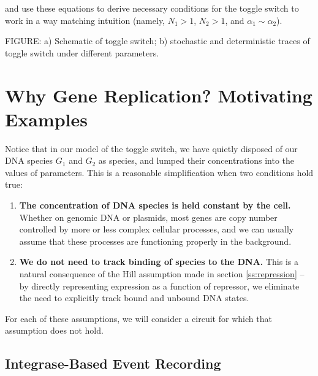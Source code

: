 \documentclass[preprint,12pt]{elsarticle}
\begin{document}
and use these equations to derive necessary conditions for the toggle switch to work in a way matching intuition (namely, $N_1 > 1$, $N_2 > 1$, and $\alpha_1 \sim \alpha_2$). 

\vspace{.5in}
FIGURE: a) Schematic of toggle switch; b) stochastic and deterministic traces of toggle switch under different parameters.
\vspace{.5in}

\section{Why Gene Replication? Motivating Examples}\label{S:motivation}

Notice that in our model of the toggle switch, we have quietly disposed of our DNA species $G_1$ and $G_2$ as species, and lumped their concentrations into the values of parameters. This is a reasonable simplification when two conditions hold true:

\begin{enumerate}
	\item \textbf{The concentration of DNA species is held constant by the cell.} Whether on genomic DNA or plasmids, most genes are copy number controlled by more or less complex cellular processes, and we can usually assume that these processes are functioning properly in the background.
	\item \textbf{We do not need to track binding of species to the DNA.} This is a natural consequence of the Hill assumption made in section \ref{ss:repression} -- by directly representing expression as a function of repressor, we eliminate the need to explicitly track bound and unbound DNA states. 
\end{enumerate}

For each of these assumptions, we will consider a circuit for which that assumption does not hold. 

\subsection{Integrase-Based Event Recording}
\end{document}
